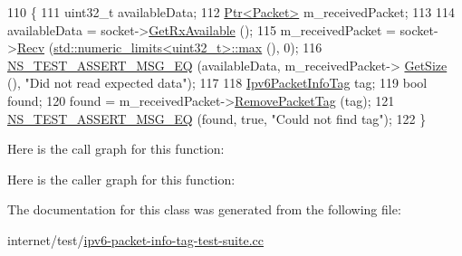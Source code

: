 \begin{DoxyCode}
110 \{
111   uint32\_t availableData;
112   \hyperlink{classns3_1_1Ptr}{Ptr<Packet>} m\_receivedPacket;
113 
114   availableData = socket->\hyperlink{classns3_1_1Socket_ad35d8931e53ae0754ee864acb1cecd0e}{GetRxAvailable} ();
115   m\_receivedPacket = socket->\hyperlink{classns3_1_1Socket_a8949b1f844aae563446f2f4c5be8827a}{Recv} (\hyperlink{80211b_8c_affe776513b24d84b39af8ab0930fef7f}{std::numeric\_limits<uint32\_t>::max}
       (), 0);
116   \hyperlink{group__testing_ga2a9d78cffb3db8e867c35fff0b698cf5}{NS\_TEST\_ASSERT\_MSG\_EQ} (availableData, m\_receivedPacket->
      \hyperlink{classns3_1_1Packet_a462855c9929954d4301a4edfe55f4f1c}{GetSize} (), \textcolor{stringliteral}{"Did not read expected data"});
117 
118   \hyperlink{classns3_1_1Ipv6PacketInfoTag}{Ipv6PacketInfoTag} tag;
119   \textcolor{keywordtype}{bool} found;
120   found = m\_receivedPacket->\hyperlink{classns3_1_1Packet_a078fe922d976a417ab25ba2f3c2fd667}{RemovePacketTag} (tag);
121   \hyperlink{group__testing_ga2a9d78cffb3db8e867c35fff0b698cf5}{NS\_TEST\_ASSERT\_MSG\_EQ} (found, \textcolor{keyword}{true}, \textcolor{stringliteral}{"Could not find tag"});
122 \}
\end{DoxyCode}


Here is the call graph for this function\+:




Here is the caller graph for this function\+:




The documentation for this class was generated from the following file\+:\begin{DoxyCompactItemize}
\item 
internet/test/\hyperlink{ipv6-packet-info-tag-test-suite_8cc}{ipv6-\/packet-\/info-\/tag-\/test-\/suite.\+cc}\end{DoxyCompactItemize}
